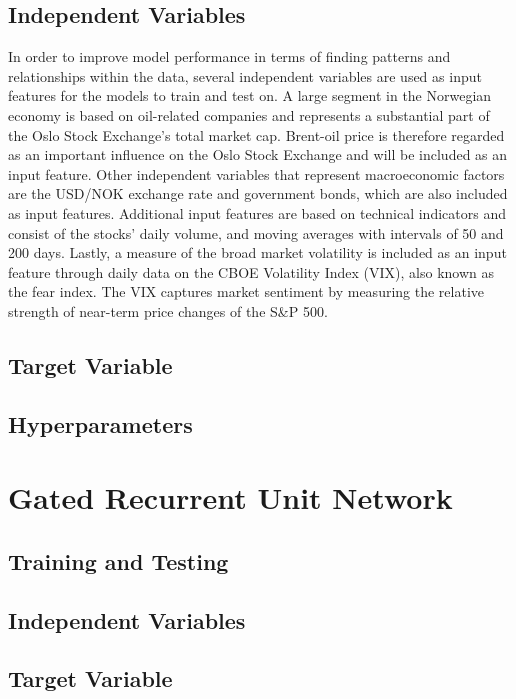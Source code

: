 \subsection{Independent Variables}
In order to improve model performance in terms of finding patterns and relationships within the data, several independent variables are used as input features for the models to train and test on. A large segment in the Norwegian economy is based on oil-related companies and represents a substantial part of the Oslo Stock Exchange's total market cap. Brent-oil price is therefore regarded as an important influence on the Oslo Stock Exchange and will be included as an input feature. Other independent variables that represent macroeconomic factors are the USD/NOK exchange rate and government bonds, which are also included as input features. Additional input features are based on technical indicators and consist of the stocks' daily volume, and moving averages with intervals of 50 and 200 days. Lastly, a measure of the broad market volatility is included as an input feature through daily data on the CBOE Volatility Index (VIX), also known as the fear index. The VIX captures market sentiment by measuring the relative strength of near-term price changes of the S\&P 500.  

\subsection{Target Variable}

\subsection{Hyperparameters}

\section{Gated Recurrent Unit Network}

\subsection{Training and Testing}

\subsection{Independent Variables}

\subsection{Target Variable}

